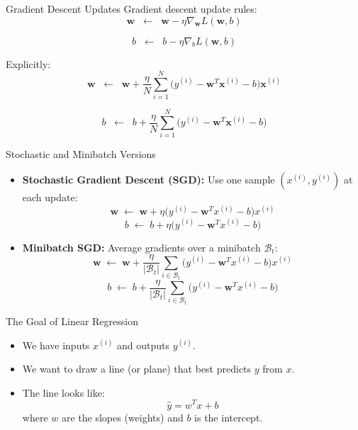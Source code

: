 \documentclass[../../main.tex]{subfiles}
\begin{document}
\begin{frame}{Gradient Descent Updates}
Gradient descent update rules:
\[
\mathbf{w} \;\;\leftarrow\;\; \mathbf{w} - \eta \nabla_{\mathbf{w}} L(\mathbf{w}, b)
\]

\[
b \;\;\leftarrow\;\; b - \eta \nabla_{b} L(\mathbf{w}, b)
\]

Explicitly:
\[
\mathbf{w} \;\;\leftarrow\;\; 
\mathbf{w} + \frac{\eta}{N} \sum_{i=1}^N \big( y^{(i)} - \mathbf{w}^T \mathbf{x}^{(i)} - b \big)\mathbf{x}^{(i)}
\]

\[
b \;\;\leftarrow\;\; 
b + \frac{\eta}{N} \sum_{i=1}^N \big( y^{(i)} - \mathbf{w}^T \mathbf{x}^{(i)} - b \big)
\]
\end{frame}

\begin{frame}{Stochastic and Minibatch Versions}
\begin{itemize}
    \item \textbf{Stochastic Gradient Descent (SGD):}
    Use one sample $(x^{(i)}, y^{(i)})$ at each update:
    \[
    \mathbf{w} \;\leftarrow\; \mathbf{w} + \eta \big( y^{(i)} - \mathbf{w}^T x^{(i)} - b \big) x^{(i)}
    \]
    \[
    b \;\leftarrow\; b + \eta \big( y^{(i)} - \mathbf{w}^T x^{(i)} - b \big)
    \]
    \item \textbf{Minibatch SGD:}
    Average gradients over a minibatch $\mathcal{B}_t$:
    \[
    \mathbf{w} \;\leftarrow\; \mathbf{w} + \frac{\eta}{|\mathcal{B}_t|} 
    \sum_{i \in \mathcal{B}_t} \big( y^{(i)} - \mathbf{w}^T x^{(i)} - b \big)x^{(i)}
    \]
    \[
    b \;\leftarrow\; b + \frac{\eta}{|\mathcal{B}_t|} 
    \sum_{i \in \mathcal{B}_t} \big( y^{(i)} - \mathbf{w}^T x^{(i)} - b \big)
    \]
\end{itemize}
\end{frame}

\begin{frame}{The Goal of Linear Regression}
\begin{itemize}
    \item We have inputs $x^{(i)}$ and outputs $y^{(i)}$.
    \item We want to draw a line (or plane) that best predicts $y$ from $x$.
    \item The line looks like:
    \[
    \hat{y} = w^T x + b
    \]
    where $w$ are the slopes (weights) and $b$ is the intercept.
\end{itemize}
\end{frame}
\end{document}
